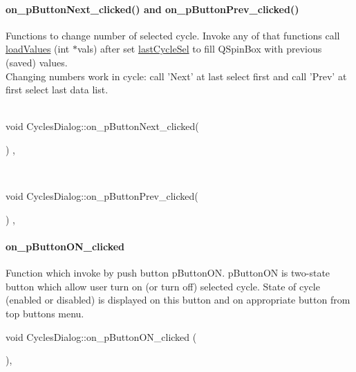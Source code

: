\paragraph{\texorpdfstring{on\+\_\+p\+Button\+Next\+\_\+clicked}{on\_pButtonNext\_clicked}() and \texorpdfstring{on\+\_\+p\+Button\+Prev\+\_\+clicked}{on\_pButtonPrev\_clicked}()}
Functions to change number of selected cycle. Invoke any of that functions call \mbox{\hyperlink{classCyclesDialog_ad25bef71c8a2219252c1458fa333a376}{load\+Values}} (int $\ast$vals) after set \mbox{\hyperlink{classCyclesDialog_a1b608c6d6ebf52a902645ee910f91ffa}{last\+Cycle\+Sel}} to fill QSpinBox with previous (saved) values.\\
Changing numbers work in cycle: call 'Next' at last select first and call 'Prev' at first select last data list.\\ \\
{\footnotesize\ttfamily void Cycles\+Dialog\+::on\+\_\+p\+Button\+Next\+\_\+clicked(\begin{DoxyParamCaption}{}\end{DoxyParamCaption}) {\ttfamily [private]}, {\ttfamily [slot]}}\\
{\footnotesize\ttfamily void Cycles\+Dialog\+::on\+\_\+p\+Button\+Prev\+\_\+clicked(\begin{DoxyParamCaption}{}\end{DoxyParamCaption}) {\ttfamily [private]}, {\ttfamily [slot]}}
\mbox{\label{classCyclesDialog_a6f7d5b5e90af9ba725ac2432f5490d92}} 
\paragraph{\texorpdfstring{on\+\_\+p\+Button\+O\+N\+\_\+clicked}{on\_pButtonON\_clicked}}
Function which invoke by push button pButtonON. pButtonON is two-state button which allow user turn on (or turn off) selected cycle. State of cycle (enabled or disabled) is displayed on this button and on appropriate button from top buttons menu.\\
{\footnotesize\ttfamily void Cycles\+Dialog\+::on\+\_\+p\+Button\+O\+N\+\_\+clicked (\begin{DoxyParamCaption}{ }\end{DoxyParamCaption}){\ttfamily [private]}, {\ttfamily [slot]}}

